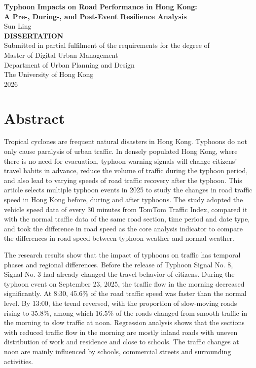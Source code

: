 \documentclass[12pt,a4paper]{report}
\begin{document}
\begin{titlepage}
\centering
\vspace*{2.5cm}
{\Large \textbf{Typhoon Impacts on Road Performance in Hong Kong:}}\\[0.4cm]
{\Large \textbf{A Pre-, During-, and Post-Event Resilience Analysis}}\\[2.2cm]
{\large Sun Ling}\\[1.2cm]
{\large \textbf{DISSERTATION}}\\[0.7cm]
{\large Submitted in partial fulfilment of the requirements for the degree of}\\[0.3cm]
{\large Master of Digital Urban Management}\\[1.2cm]
{\large Department of Urban Planning and Design}\\[0.3cm]
{\large The University of Hong Kong}\\[1.5cm]
{\large 2026}
\end{titlepage}


\chapter*{Abstract}
Tropical cyclones are frequent natural disasters in Hong Kong. Typhoons do not only cause paralysis of urban traffic. In densely populated Hong Kong, where there is no need for evacuation, typhoon warning signals will change citizens' travel habits in advance, reduce the volume of traffic during the typhoon period, and also lead to varying speeds of road traffic recovery after the typhoon. This article selects multiple typhoon events in 2025 to study the changes in road traffic speed in Hong Kong before, during and after typhoons. The study adopted the vehicle speed data of every 30 minutes from TomTom Traffic Index, compared it with the normal traffic data of the same road section, time period and date type, and took the difference in road speed as the core analysis indicator to compare the differences in road speed between typhoon weather and normal weather.

The research results show that the impact of typhoons on traffic has temporal phases and regional differences. Before the release of Typhoon Signal No. 8, Signal No. 3 had already changed the travel behavior of citizens. During the typhoon event on September 23, 2025, the traffic flow in the morning decreased significantly. At 8:30, 45.6\% of the road traffic speed was faster than the normal level. By 13:00, the trend reversed, with the proportion of slow-moving roads rising to 35.8\%, among which 16.5\% of the roads changed from smooth traffic in the morning to slow traffic at noon. Regression analysis shows that the sections with reduced traffic flow in the morning are mostly inland roads with uneven distribution of work and residence and close to schools. The traffic changes at noon are mainly influenced by schools, commercial streets and surrounding activities.
\end{document}
